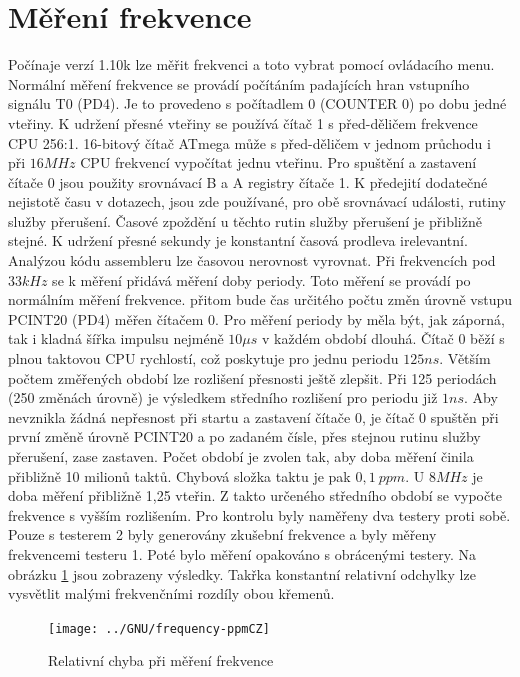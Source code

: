 
\section{Měření frekvence}
\label{sec:frequency}

Počínaje verzí 1.10k lze měřit frekvenci a toto vybrat pomocí ovládacího menu.
Normální měření frekvence se provádí počítáním padajících hran vstupního signálu T0 (PD4).
Je to provedeno s počítadlem 0 (COUNTER 0) po dobu jedné vteřiny.
K udržení přesné vteřiny se používá čítač 1 s před-děličem frekvence CPU 256:1.
16-bitový čítač ATmega může s před-děličem v jednom průchodu i při \(16MHz\) CPU frekvencí vypočítat jednu vteřinu.
Pro spuštění a zastavení čítače 0 jsou použity srovnávací B a A registry čítače 1.
K předejití dodatečné nejistotě času v dotazech, jsou zde  používané, pro obě srovnávací události,
rutiny služby přerušení. Časové zpoždění u těchto rutin služby přerušení je přibližně stejné.
K udržení přesné sekundy je konstantní časová prodleva irelevantní.
Analýzou kódu assembleru lze časovou nerovnost vyrovnat.
Při frekvencích pod \(33kHz\) se k měření přidává měření doby periody.
Toto měření se provádí po normálním měření frekvence.
přitom bude čas určitého počtu změn úrovně vstupu PCINT20 (PD4) měřen čítačem 0.
Pro měření periody by měla být, jak záporná, tak i kladná šířka impulsu
nejméně \(10\mu s\)  v každém období dlouhá.
Čítač 0 běží s plnou taktovou CPU rychlostí, což poskytuje pro jednu periodu \(125ns\).
Větším počtem změřených období lze rozlišení přesnosti ještě zlepšit.
Při 125 periodách (250 změnách úrovně) je výsledkem středního rozlišení pro periodu již \(1ns\).
Aby nevznikla žádná nepřesnost při startu a zastavení čítače 0, je čítač 0 spuštěn při první změně úrovně
PCINT20 a po zadaném čísle, přes stejnou rutinu služby přerušení, zase zastaven.
Počet období je zvolen tak, aby doba měření činila přibližně 10 milionů taktů.
Chybová složka taktu je pak \(0,1~ppm\). U \(8MHz\) je doba měření přibližně 1,25 vteřin.
Z takto určeného středního období se vypočte frekvence s vyšším rozlišením.
Pro kontrolu byly naměřeny dva testery proti sobě.
Pouze s testerem 2 byly generovány zkušební frekvence a byly měřeny frekvencemi testeru 1.
Poté bylo měření opakováno s obrácenými testery.
Na obrázku \ref{fig:freq-ppm} jsou zobrazeny výsledky.
Takřka konstantní relativní odchylky lze vysvětlit malými frekvenčními rozdíly obou křemenů.

\begin{figure}[H]
\centering
\texttt{[image: ../GNU/frequency-ppmCZ]}
\caption{Relativní chyba při měření frekvence}
\label{fig:freq-ppm}
\end{figure}

